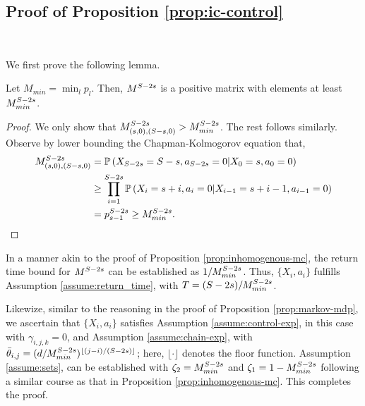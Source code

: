 \documentclass[opre,sglanonrev]{informs4}
\numberwithin{equation}{section}
\newcommand{\lp}{\left(}
\newcommand{\rp}{\right)}
\newcommand{\Pbb}{\mathbb{P}}
\newcommand{\prob}{\Pbb}
\begin{document}
\begin{APPENDICES}
{\subsection{Proof of Proposition \ref{prop:ic-control}}~\label{sec:prf-icc}

We first prove the following lemma.
\begin{lemma}
    Let $M_{min}=\min_{l} p_l$. Then, $M^{\texttt{\textbf{S}}-2\texttt{\textbf{s}}}$ is a positive matrix with elements at least $M_{min}^{\texttt{\textbf{S}}-2\texttt{\textbf{s}}}$.
\end{lemma}

\begin{proof}{}
    We only show that $M^{\texttt{\textbf{S}}-2\texttt{\textbf{s}}}_{(\texttt{\textbf{s}},0),(\texttt{\textbf{S}}-\texttt{\textbf{s}},0)}>M_{min}^{\texttt{\textbf{S}}-2\texttt{\textbf{s}}}$. The rest follows similarly. Observe by lower bounding the Chapman-Kolmogorov equation that, 
    \begin{align*}
        M^{\texttt{\textbf{S}}-2\texttt{\textbf{s}}}_{(\texttt{\textbf{s}},0),(\texttt{\textbf{S}}-\texttt{\textbf{s}},0)} & = \prob\lp X_{\texttt{\textbf{S}}-2\texttt{\textbf{s}}} = \texttt{\textbf{S}}-\texttt{\textbf{s}}, a_{\texttt{\textbf{S}}-2\texttt{\textbf{s}}} = 0 | X_0 = \texttt{\textbf{s}},a_0=0 \rp\\
        & \geq \prod_{i=1}^{\texttt{\textbf{S}}-2\texttt{\textbf{s}}} \prob\lp X_i = \texttt{\textbf{s}}+i,a_i = 0| X_{i-1}=\texttt{\textbf{s}}+i-1,a_{i-1} = 0\rp \\
        & = p_{\texttt{\textbf{s}}-1}^{\texttt{\textbf{S}}-2\texttt{\textbf{s}}} \geq M_{min}^{\texttt{\textbf{S}}-2\texttt{\textbf{s}}}.
    \end{align*}
\end{proof}
In a manner akin to the proof of Proposition \ref{prop:inhomogenous-mc}, the return time bound for $M^{\texttt{\textbf{S}}-2\texttt{\textbf{s}}}$ can be established as $1/M_{min}^{\texttt{\textbf{S}}-2\texttt{\textbf{s}}}$. Thus, $\{X_i,a_i\}$ fulfills Assumption \ref{assume:return_time}, with  $T=(\texttt{\textbf{S}}-2\texttt{\textbf{s}})/M_{min}^{\texttt{\textbf{S}}-2\texttt{\textbf{s}}}$.

Likewize, similar to the reasoning in the proof of Proposition \ref{prop:markov-mdp}, we ascertain that $\{X_{i},a_i\}$ satisfies Assumption \ref{assume:control-exp}, in this case with $\gamma_{i,j,k}=0$, and Assumption \ref{assume:chain-exp}, with $\bar \theta_{i,j} = (d/M_{min}^{\texttt{\textbf{S}}-2\texttt{\textbf{s}}})^{\lfloor(j-i)/(\texttt{\textbf{S}}-2\texttt{\textbf{s}})\rfloor}$; here, $\lfloor\cdot\rfloor$ denotes the floor function. Assumption \ref{assume:sets},  can be established with $\zeta_2 = M_{min}^{\texttt{\textbf{S}}-2\texttt{\textbf{s}}}$ and $\zeta_1=1-M_{min}^{\texttt{\textbf{S}}-2\texttt{\textbf{s}}}$ following a similar course as that in Proposition \ref{prop:inhomogenous-mc}. This completes the proof.
}

\end{APPENDICES}
\end{document}
